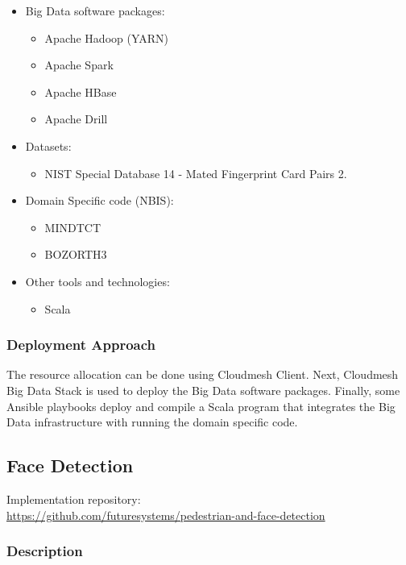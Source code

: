 \documentclass[9pt,twocolumn,twoside]{styles/osajnl}
\begin{document}
\begin{itemize}
\item Big Data software packages:

\begin{itemize}
\item Apache Hadoop (YARN)
\item Apache Spark
\item Apache HBase
\item Apache Drill
\end{itemize}

\item Datasets:
\begin{itemize}
\item NIST Special Database 14 - Mated Fingerprint Card Pairs 2.
\end{itemize}

\item Domain Specific code (NBIS):
\begin{itemize}
\item MINDTCT
\item BOZORTH3
\end{itemize}


\item Other tools and technologies:
\begin{itemize}
\item Scala
\end{itemize}

\end{itemize}

\subsubsection{Deployment Approach}

The resource allocation can be done using Cloudmesh Client.
Next, Cloudmesh Big Data Stack is used to deploy the Big Data software packages.
Finally, some Ansible playbooks deploy and compile a Scala program that integrates the Big Data infrastructure with running the domain specific code.

\subsection{Face Detection}

Implementation repository:\\
 \url{https://github.com/futuresystems/pedestrian-and-face-detection}

\subsubsection{Description}
\end{document}

